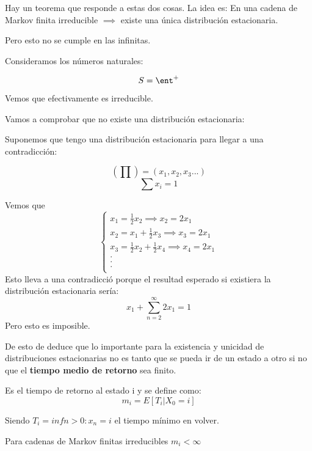 Hay un teorema que responde a estas dos cosas.
La idea es:
	En una cadena de Markov finita irreducible $\implies$ existe una única distribución estacionaria.
	
	Pero esto no se cumple en las infinitas.
	\begin{example}
		Consideramos los números naturales:
		\begin{center}
			
			
		\end{center}
		$$S = \ent ^+$$
		Vemos que efectivamente es irreducible.
		
		Vamos a comprobar que no existe una distribución estacionaria:
		
		Suponemos que tengo una distribución estacionaria para llegar a una contradicción:
		
		$$(\prod) = (x_1, x_2, x_3...)$$
		$$\sum x_i = 1$$
		
		Vemos que
		$$
		\begin{cases}
		x_1 = \frac{1}{2} x_2 \implies x_2 = 2x_1\\
		x_2 = x_1 + \frac{1}{2} x_3 \implies x_3 = 2x_1\\
		x_3 = \frac{1}{2} x_2 + \frac{1}{2} x_4 \implies x_4 = 2x_1\\
		.\\
		.\\
		.\\
		\end{cases}$$
		Esto lleva a una contradicció porque el resultad esperado si existiera la distribución estacionaria sería:
		$$x_1 + \sum_{n=2}^{\infty} 2 x_1 =1$$
		Pero esto es imposible.
	\end{example}
	
	
	
	De esto de deduce que lo importante para la existencia y unicidad de distribuciones estacionarias no es tanto que se pueda ir de un estado a otro si no que el \textbf{tiempo medio de retorno} sea finito.
	
	\begin{defn}
		Es el tiempo de retorno al estado i y se define como:
		$$m_i = E[T_i|X_0 = i]$$
		
		Siendo $T_i = inf{n>0 : x_n = i}$ el tiempo mínimo en volver.
	\end{defn}
	
	\obs Para cadenas de Markov finitas irreducibles $m_i < \infty$
	
